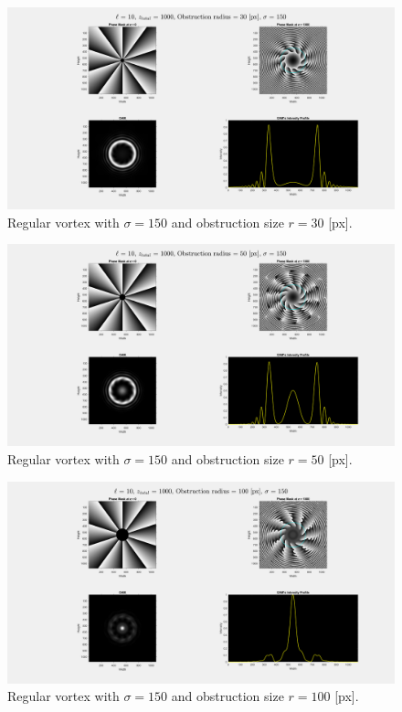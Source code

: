 \begin{figure}[htbp]
    \centering
    \includegraphics[width=12cm]{images/Appendices/Additional_Results/Sigma_150/type=0_r=30_zi=0_zf=1000.png}
    \caption{Regular vortex with $\sigma = 150$ and obstruction size $r=30$ [px].}
    \label{fig:reg_sig150_r=30}
\end{figure}

\begin{figure}[htbp]
    \centering
    \includegraphics[width=12cm]{images/Appendices/Additional_Results/Sigma_150/type=0_r=50_zi=0_zf=1000.png}
    \caption{Regular vortex with $\sigma = 150$ and obstruction size $r=50$ [px].}
    \label{fig:reg_sig150_r=50}
\end{figure}

\begin{figure}[htbp]
    \centering
    \includegraphics[width=12cm]{images/Appendices/Additional_Results/Sigma_150/type=0_r=100_zi=0_zf=1000.png}
    \caption{Regular vortex with $\sigma = 150$ and obstruction size $r=100$ [px].}
    \label{fig:reg_sig150_r=100}
\end{figure}

